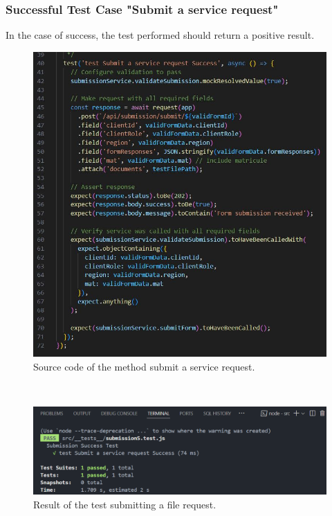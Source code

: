 \subsubsection{Successful Test Case "Submit a service request"} 
In the case of success, the test performed should return a positive result.
\begin{figure}[h!]
    \centering
    \includegraphics[width=1\textwidth]{figures/subScode.JPG}  %
    \caption{Source code of the method submit a service request.}
\end{figure} \
\begin{figure}[h!]
    \centering
    \includegraphics[width=1\textwidth]{figures/test success submit service request.png}  
    \caption{Result of the test submitting a file request.}
\end{figure} \
\clearpage
